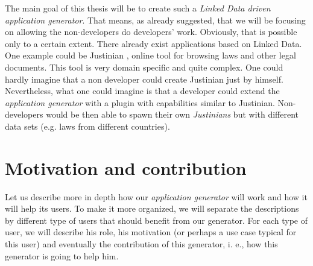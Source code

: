 The main goal of this thesis will be to create such a \emph{Linked Data driven application generator}. That means, as already suggested, that we will be focusing on allowing the non-developers do developers' work. Obviously, that is possible only to a certain extent. There already exist applications based on Linked Data. One example could be Justinian \cite{justinian}, online tool for browsing laws and other legal documents. This tool is very domain specific and quite complex. One could hardly imagine that a non developer could create Justinian just by himself. Nevertheless, what one could imagine is that a developer could extend the \emph{application generator} with a plugin with capabilities similar to Justinian. Non-developers would be then able to spawn their own \emph{Justinians} but with different data sets (e.g. laws from different countries).

\section*{Motivation and contribution}
%
%
%
Let us describe more in depth how our \emph{application generator} will work and how it will help its users. To make it more organized, we will separate the descriptions by different type of users that should benefit from our generator. For each type of user, we will describe his role, his motivation (or perhaps a use case typical for this user) and eventually the contribution of this generator, i. e., how this generator is going to help him.

